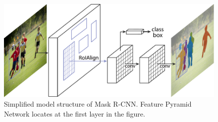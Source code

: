 \begin{figure}[!h]
	\centering
	\includegraphics[width=\fig\textwidth]{2-03.pdf}
    \caption[Simplified model structure of Mask R-CNN]{Simplified model structure of Mask R-CNN. Feature Pyramid Network locates at the first layer in the figure.}
    \label{fig:rcnnsimmod}
\end{figure}